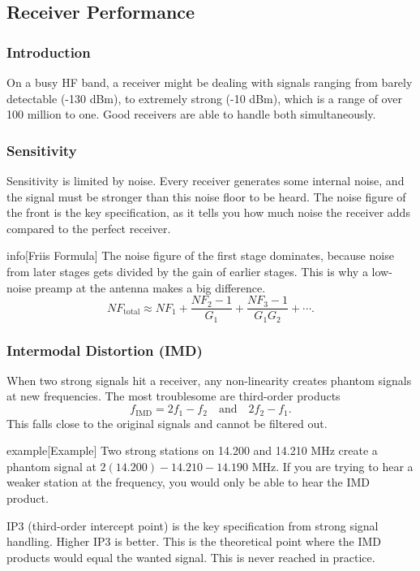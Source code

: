 \documentclass{article}
\begin{document}
\subsection{Receiver Performance}
\subsubsection{Introduction}
On a busy HF band, a receiver might be dealing with signals ranging from barely detectable (-130 dBm), to extremely strong (-10 dBm), which is a range of over 100 million to one. Good receivers are able to handle both simultaneously.

\subsubsection{Sensitivity}
Sensitivity is limited by noise. Every receiver generates some internal noise, and the signal must be stronger than this noise floor to be heard. The noise figure of the front is the key specification, as it tells you how much noise the receiver adds compared to the perfect receiver.
\begin{callout}{info}[Friis Formula]
    The noise figure of the first stage dominates, because noise from later stages gets divided by the gain of earlier stages. This is why a low-noise preamp at the antenna makes a big difference.
    \[
        NF_{\text{total}}\approx NF_{1}+\frac{NF_2-1}{G_1}+\frac{NF_3-1}{G_1G_2}+\cdots.
    \]
\end{callout}

\subsubsection{Intermodal Distortion (IMD)}
When two strong signals hit a receiver, any non-linearity creates phantom signals at new frequencies. The most troublesome are third-order products
\[
    f_{\text{IMD}}=2f_1-f_2\quad \text{and}\quad 2f_2-f_1.
\]
This falls close to the original signals and cannot be filtered out.
\begin{callout}{example}[Example]
    Two strong stations on 14.200 and 14.210 MHz create a phantom signal at $2(14.200)-14.210-14.190$ MHz. If you are trying to hear a weaker station at the frequency, you would only be able to hear the IMD product.
\end{callout}

IP3 (third-order intercept point) is the key specification from strong signal handling. Higher IP3 is better. This is the theoretical point where the IMD products would equal the wanted signal. This is never reached in practice.
\end{document}
